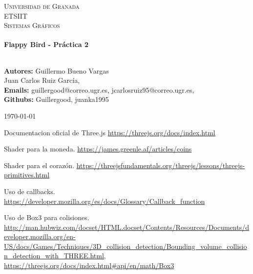 \documentclass[12zpt]{article}
\begin{document}
\begin{center}
\vspace*{-1.5cm}								%
\textsc{\huge Universidad de Granada\\ \vspace{5px} ETSIIT}\\[1.5cm]	

\textsc{\LARGE Sistemas Gráficos}\\[1.5cm]													%

 			\vspace*{1cm}																		%
\HRule \\[0.4cm]																	%
{ \huge \bfseries Flappy Bird - Práctica 2}\\[0.4cm]	%
\HRule \\[1.5cm]																	%
\begin{minipage}{0.46\textwidth}													%
\begin{center} \large															%
\textbf{Autores:} Guillermo Bueno Vargas\\
Juan Carlos Ruiz García,\\
\textbf{Emails:} guillergood@correo.ugr.es, jcarlosruiz95@correo.ugr.es,\\
\textbf{Githubs:} Guillergood, juanka1995\\ 
\end{center}																		%
\end{minipage}		
\vspace{7cm} 																				
\begin{center}																					
{\large \today}																	%
 			\end{center}												  						
\end{center}							 											
																					
\newpage																		


\begin{thebibliography}{9}
	Documentacion oficial de Three.js
	\url{https://threejs.org/docs/index.html}
	
	Shader para la moneda.
	\url{https://james.greenle.af/articles/coins}

	Shader para el corazón.
	\url{https://threejsfundamentals.org/threejs/lessons/threejs-primitives.html}

	Uso de callbacks.
	\url{https://developer.mozilla.org/es/docs/Glossary/Callback_function}
	
	Uso de Box3 para colisiones.
	\url{http://man.hubwiz.com/docset/HTML.docset/Contents/Resources/Documents/developer.mozilla.org/en-US/docs/Games/Techniques/3D_collision_detection/Bounding_volume_collision_detection_with_THREE.html},
	\url{https://threejs.org/docs/index.html#api/en/math/Box3}
\end{thebibliography}


% 

\end{document}
